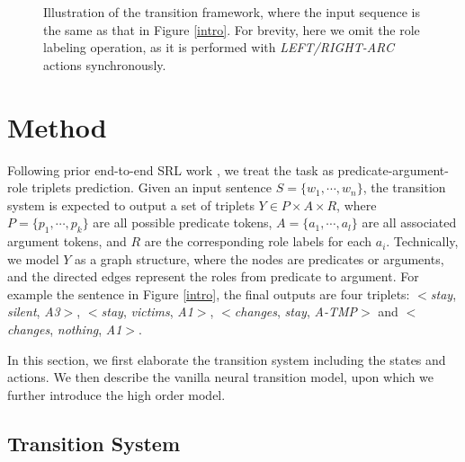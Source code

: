 \documentclass[letterpaper]{article} \usepackage{aaai21}  \usepackage{times}  \usepackage{helvet} \usepackage{courier}  \usepackage[hyphens]{url}  \usepackage{graphicx} \urlstyle{rm} \def\UrlFont{\rm}  \usepackage{natbib}  \usepackage{caption}
\begin{document}
\begin{CJK}{UTF8}{gbsn}
\begin{figure*}[!t]
\centering
{}
\caption{
Illustration of the transition framework, where the input sequence is the same as that in Figure \ref{intro}.
For brevity, here we omit the role labeling operation, as it is performed with \emph{LEFT/RIGHT-ARC} actions synchronously.
}
\label{sequence}
\end{figure*}













\section{Method}


Following prior end-to-end SRL work \cite{he-etal-2018-jointly,LiHZZZZZ19}, we treat the task as predicate-argument-role triplets prediction.
Given an input sentence $S = \{w_1, \cdots, w_n\}$,
the transition system is expected to output a set of triplets $Y \in P \times A \times R$,
where $P = \{p_1, \cdots, p_k\}$ are all possible predicate tokens, $A = \{a_1, \cdots, a_l\}$ are all associated argument tokens,
and $R$ are the corresponding role labels for each $a_i$.
Technically, we model $Y$ as a graph structure, where the nodes are predicates or arguments, and the directed edges represent the roles from predicate to argument.
For example the sentence in Figure \ref{intro}, the final outputs are four triplets: $<$\emph{stay}, \emph{silent}, \emph{A3}$>$, $<$\emph{stay}, \emph{victims}, \emph{A1}$>$, $<$\emph{changes}, \emph{stay}, \emph{A-TMP}$>$ and $<$\emph{changes}, \emph{nothing}, \emph{A1}$>$.


In this section, we first elaborate the transition system including the states and actions.
We then describe the vanilla neural transition model, upon which we further introduce the high order model.



\subsection{Transition System}



\end{CJK}
\end{document}
